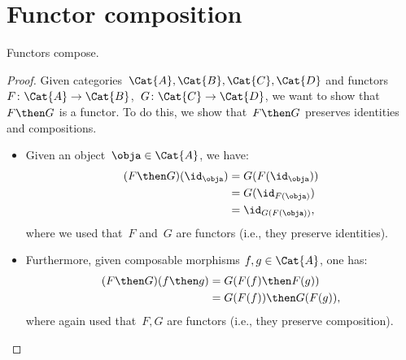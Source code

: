  
\section{Functor composition}


\begin{lemma}
Functors compose.
\end{lemma}
\begin{proof}
Given categories~$\Cat{A},\Cat{B},\Cat{C},\Cat{D}$ and functors~$F\colon \Cat{A}\to \Cat{B}$,~$G\colon \Cat{C}\to \Cat{D}$, we want to show that~$F\then G$ is a functor. To do this, we show that~$F\then G$ preserves identities and compositions. 
\begin{itemize}
    \item Given an object~$\obja\in \Cat{A}$, we have:
    \begin{equation*}
        \begin{aligned}
            (F\then G)(\id_\obja)&=G(F(\id_\obja))\\
            &=G(\id_{F(\obja)})\\
            &=\id_{G(F(\obja))},
        \end{aligned}
    \end{equation*}
    where we used that~$F$ and~$G$ are functors (i.e., they preserve identities).
    \item Furthermore, given composable morphisms $f,g\in \Cat{A}$, one has:
    \begin{equation*}
        \begin{aligned}
            (F\then G)(f\then g)&=G(F(f)\then F(g))\\
            &=G(F(f))\then G(F(g)),
        \end{aligned}
    \end{equation*}
    where again used that~$F,G$ are functors (i.e., they preserve composition).
\end{itemize}
\end{proof}

